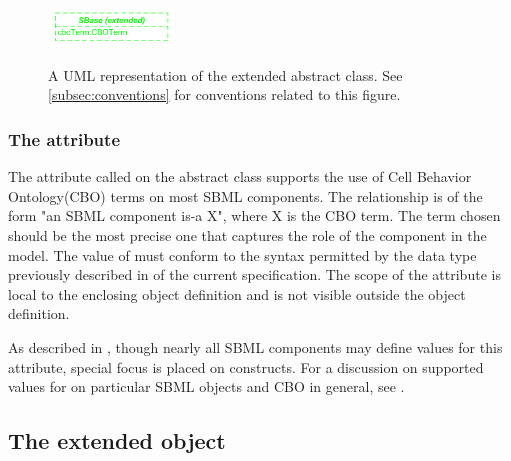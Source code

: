 
\begin{figure}[tbhp]
	\centering
	\includegraphics[width=0.30\textwidth]{images/UMLExtendedSBase.pdf}\\
	\caption{A UML representation of the extended \SBase abstract class. See \ref{subsec:conventions} for conventions related to this figure.} \label{fig:UMLExtendedSBase}
\end{figure}

\subsubsection{The  attribute}
\label{attr:cboTerm}

The attribute called  on the \SBase abstract class supports the use of Cell Behavior Ontology(CBO) terms on most SBML components. The relationship is of the form "an SBML component is-a X", where X is the CBO term. The term chosen should be the most precise one that captures the role of the component in the model. The value of  must conform to the syntax permitted by the  data type previously described in  of the current specification. The scope of the  attribute is local to the enclosing object definition and is not visible outside the object definition. 

As described in , though nearly all SBML components may define values for this attribute, special focus is placed on \Event constructs. For a discussion on supported values for  on particular SBML objects and CBO in general, see .


\subsection{The extended  object}
\label{subsec:extEvent}

